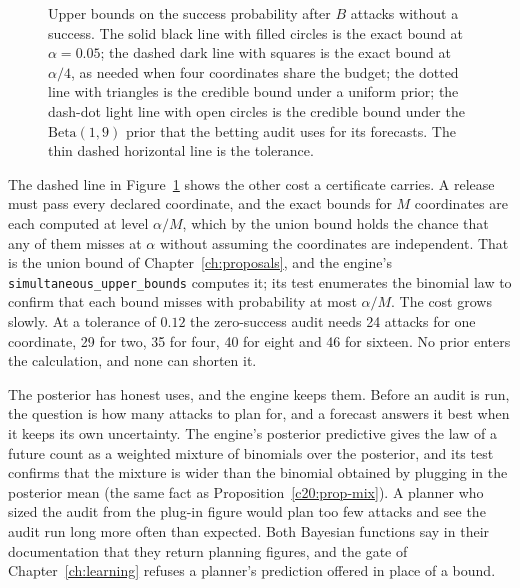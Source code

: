 \begin{figure}[ht]
\caption{Upper bounds on the success probability after $B$ attacks without a success. The solid black line
with filled circles is the exact bound at $\alpha=0.05$; the dashed dark line with squares is the exact
bound at $\alpha/4$, as needed when four coordinates share the budget; the dotted line with triangles
is the credible bound under a uniform prior; the dash-dot light line with open circles is the credible
bound under the $\mathrm{Beta}(1,9)$ prior that the betting audit uses for its forecasts. The thin dashed
horizontal line is the tolerance.}
\label{c22:fig-bounds}
\end{figure}

The dashed line in Figure~\ref{c22:fig-bounds} shows the other cost a certificate carries. A release must pass
every declared coordinate, and the exact bounds for $M$ coordinates are each computed at level
$\alpha/M$, which by the union bound holds the chance that any of them misses at $\alpha$ without
assuming the coordinates are independent. That is the union bound of Chapter~\ref{ch:proposals}, and the engine's
\texttt{simultaneous\_upper\_bounds} computes it; its test enumerates the binomial law to confirm that
each bound misses with probability at most $\alpha/M$. The cost grows slowly. At a tolerance of $0.12$
the zero-success audit needs 24 attacks for one coordinate, 29 for two, 35 for four, 40 for eight
and 46 for sixteen. No prior enters the calculation, and none can shorten it.

The posterior has honest uses, and the engine keeps them. Before an audit is run, the question is
how many attacks to plan for, and a forecast answers it best when it keeps its own uncertainty. The
engine's posterior predictive gives the law of a future count as a weighted mixture of binomials
over the posterior, and its test confirms that the mixture is wider than the binomial obtained by
plugging in the posterior mean (the same fact as Proposition~\ref{c20:prop-mix}). A planner who sized the audit from the plug-in figure
would plan too few attacks and see the audit run long more often than expected. Both Bayesian
functions say in their documentation that they return planning figures, and the gate of
Chapter~\ref{ch:learning} refuses a planner's prediction offered in place of a bound.

